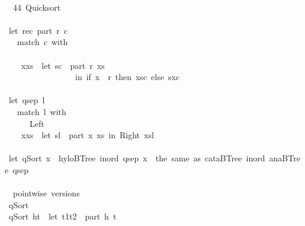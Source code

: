 \documentclass[a4paper]{article}
\begin{document}
\begin{tabbing}
\ttfamily ~\\
\ttfamily ~~44~Quicksort~\\
\ttfamily ~\\
\ttfamily ~let~rec~part~r~c~~\\
\ttfamily ~~~match~c~with\\
\ttfamily ~~~~~~\\
\ttfamily ~~~~xxs~~let~sc~~part~r~xs~\\
\ttfamily ~~~~~~~~~~~~~~~~~in~if~x~~r~then~xsc~else~sxc\\
\ttfamily ~\\
\ttfamily ~let~qsep~l~~\\
\ttfamily ~~~match~l~with\\
\ttfamily ~~~~~~Left~\\
\ttfamily ~~~~xxs~~let~sl~~part~x~xs~in~Right~xsl\\
\ttfamily ~\\
\ttfamily ~let~qSort~x~~hyloBTree~inord~qsep~x~~the~same~as~cataBTree~inord~anaBTree~qsep\\
\ttfamily ~\\
\ttfamily ~~pointwise~versions\\
\ttfamily ~qSort~~~\\
\ttfamily ~qSort~ht~~let~t1t2~~part~h~t\\

\end{tabbing}
\end{document}
